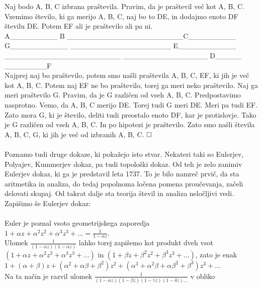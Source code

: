 \documentclass[a4paper,12pt]{article}
\def\qed{$\hfill\Box$}   %
\begin{document}
	Naj bodo A, B, C izbrana praštevila. Pravim, da je praštevil več kot
	A, B, C. Vzemimo število, ki ga merijo A, B, C, naj bo to DE, in dodajmo
	enoto DF številu DE. Potem EF ali je praštevilo ali pa ni.
	\\
	A\_\_\_\_\_\_\_\_\_ B \_\_\_\_\_\_\_\_\_\_\_\_\_\_\_\_\_\_\_\_\_\_C\_\_\_\_\_\_\_\_\_
	\\
	G\_\_\_\_\_\_\_\_\_\_\_
	\_\_\_\_\_\_\_\_\_\_\_\_\_\_\_\_\_\_\_ E\_\_\_\_\_\_\_\_\_\_\_
	\\
	\_\_\_\_\_\_\_\_\_\_\_\_\_\_\_\_\_\_\_\_\_\_
	\_\_\_\_\_\_\_\_\_\_\_\_\_\_\_\_
	D\_\_\_\_\_
	\\
	\_\_\_\_\_\_\_\_F
	\\
	Najprej naj bo praštevilo, potem smo našli praštevila A, B, C, EF, ki jih je več
	kot A, B, C. Potem naj EF ne bo praštevilo, torej ga meri neko praštevilo.
	Naj ga meri praštevilo G. Pravim, da je G različen od vseh A, B, C.
	Predpostavimo nasprotno. Vemo, da A, B, C merijo DE. Torej tudi G meri
	DE. Meri pa tudi EF. Zato mora G, ki je število, deliti tudi preostalo enoto
	DF, kar je protislovje. Tako je G različen od vseh A, B, C. In po hipotezi je
	praštevilo. Zato smo našli števila A, B, C, G, ki jih je več od izbranih A, B, C.
\qed
\\
\\
Poznamo tudi druge dokaze, ki pokažejo isto stvar. Nekateri taki so Eulerjev,
Polyajev, Kummerjev dokaz, pa tudi topološki dokaz.
Od teh je zelo zanimiv Eulerjev dokaz, ki ga je predstavil leta 1737. To je bilo
namreč prvič, da sta aritmetika in analiza, do tedaj popolnoma ločena pomena
proučevanja, začeli delovati skupaj. Od takrat dalje sta teorija števil in analiza
neločljivi vedi.
Zapišimo še Eulerjev dokaz:
\\
\\
	Euler je poznal vsoto geometrijskega zaporedja
	\\
	$1 + \alpha z + \alpha^2z^2 + \alpha ^3z^3 + \ldots = \frac{1}{1-\alpha z}$.
\\
	Ulomek $\frac{1}{(1-\alpha z)(1-\alpha z)}$ lahko torej zapišemo kot produkt dveh vsot
	\\
	$(1 +\alpha z +\alpha^2z^2 +\alpha^3z^3 + \ldots)$ in $(1 +\beta z +\beta^2z^2 +\beta^3z^3 +\ldots)$, zato je enak
	$1 + (\alpha+\beta)z + (\alpha^2+\alpha\beta+\beta^2)z^2 + (\alpha^3+\alpha^2\beta+\alpha\beta^2+\beta^3)z^3 + \ldots $
	\\
	Na ta način je razvil ulomek $\frac{1}{(1-\alpha z)(1-\beta z)(1-\gamma z)(1-\delta z)\ldots}$ v obliko
\end{document}
